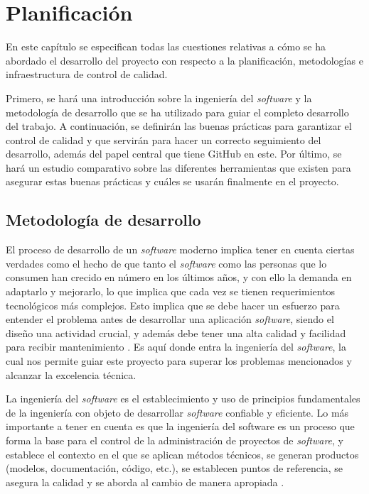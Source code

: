 \chapter{Planificación}
En este capítulo se especifican todas las cuestiones relativas a cómo se ha abordado el desarrollo del proyecto con respecto a la planificación, metodologías e infraestructura de control de calidad. 

Primero, se hará una introducción sobre la ingeniería del \textit{software} y la metodología de desarrollo que se ha utilizado para guiar el completo desarrollo del trabajo. A continuación, se definirán las buenas prácticas para garantizar el control de calidad y que servirán para hacer un correcto seguimiento del desarrollo, además del papel central que tiene GitHub en este. Por último, se hará un estudio comparativo sobre las diferentes herramientas que existen para asegurar estas buenas prácticas y cuáles se usarán finalmente en el proyecto.

\section{Metodología de desarrollo}
El proceso de desarrollo de un \textit{software} moderno implica tener en cuenta ciertas verdades como el hecho de que tanto el \textit{software} como las personas que lo consumen han crecido en número en los últimos años, y con ello la demanda en adaptarlo y mejorarlo, lo que implica que cada vez se tienen requerimientos tecnológicos más complejos. Esto implica que se debe hacer un esfuerzo para entender el problema antes de desarrollar una aplicación \textit{software}, siendo el diseño una actividad crucial, y además debe tener una alta calidad y facilidad para recibir mantenimiento \cite{pressman_software_2015}. Es aquí donde entra la ingeniería del \textit{software}, la cual nos permite guiar este proyecto para superar los problemas mencionados y alcanzar la excelencia técnica.

La ingeniería del \textit{software} es el establecimiento y uso de principios fundamentales de la ingeniería con objeto de desarrollar \textit{software} confiable y eficiente. Lo más importante a tener en cuenta es que la ingeniería del software es un proceso que forma la base para el control de la administración de proyectos de \textit{software}, y establece el contexto en el que se aplican métodos técnicos, se generan productos (modelos, documentación, código, etc.), se establecen puntos de referencia, se asegura la calidad y se aborda al cambio de manera apropiada \cite{pressman_software_2015}.

